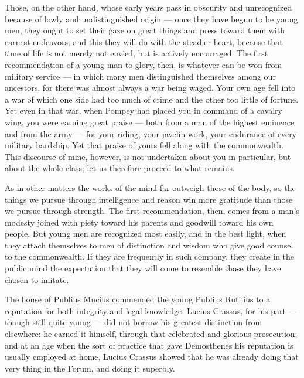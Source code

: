  Those, on the other hand, whose early years pass in obscurity and unrecognized because of lowly and undistinguished origin — once they have begun to be young men, they ought to set their gaze on great things and press toward them with earnest endeavors; and this they will do with the steadier heart, because that time of life is not merely not envied, but is actively encouraged. The first recommendation of a young man to glory, then, is whatever can be won from military service — in which many men distinguished themselves among our ancestors, for there was almost always a war being waged. Your own age fell into a war of which one side had too much of crime and the other too little of fortune. Yet even in that war, when Pompey had placed you in command of a cavalry wing, you were earning great praise — both from a man of the highest eminence and from the army — for your riding, your javelin-work, your endurance of every military hardship. Yet that praise of yours fell along with the commonwealth. This discourse of mine, however, is not undertaken about you in particular, but about the whole class; let us therefore proceed to what remains.

 As in other matters the works of the mind far outweigh those of the body, so the things we pursue through intelligence and reason win more gratitude than those we pursue through strength. The first recommendation, then, comes from a man's modesty joined with piety toward his parents and goodwill toward his own people. But young men are recognized most easily, and in the best light, when they attach themselves to men of distinction and wisdom who give good counsel to the commonwealth. If they are frequently in such company, they create in the public mind the expectation that they will come to resemble those they have chosen to imitate.

 The house of Publius Mucius commended the young Publius Rutilius to a reputation for both integrity and legal knowledge. Lucius Crassus, for his part — though still quite young — did not borrow his greatest distinction from elsewhere: he earned it himself, through that celebrated and glorious prosecution; and at an age when the sort of practice that gave Demosthenes his reputation is usually employed at home, Lucius Crassus showed that he was already doing that very thing in the Forum, and doing it superbly.

